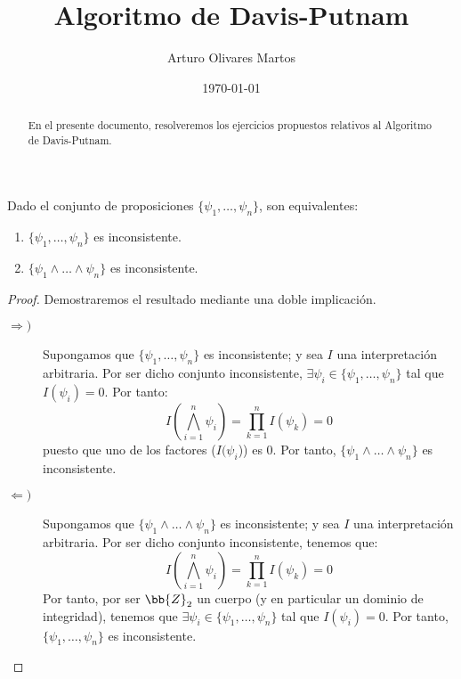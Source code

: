 \documentclass[12pt]{article}
\author{Arturo Olivares Martos}
\date{\today}
\title{Algoritmo de Davis-Putnam}
\begin{document}
    \maketitle
    \begin{abstract}
        En el presente documento, resolveremos los ejercicios propuestos relativos al Algoritmo de Davis-Putnam.
    \end{abstract}

    \begin{ejercicio}
        Dado el conjunto de proposiciones $\{\psi_1, \ldots, \psi_n\}$, son equivalentes:
        \begin{enumerate}
            \item $\{\psi_1, \ldots, \psi_n\}$ es inconsistente.
            \item $\{\psi_1 \land \ldots \land \psi_n\}$ es inconsistente.
        \end{enumerate}
        \begin{proof}
            Demostraremos el resultado mediante una doble implicación.
            \begin{description}
                \item[$\Longrightarrow)$]  Supongamos que $\{\psi_1, \ldots, \psi_n\}$ es inconsistente; y sea $I$ una interpretación arbitraria. Por ser dicho conjunto inconsistente, $\exists \psi_i \in \{\psi_1, \ldots, \psi_n\}$ tal que $I(\psi_i) = 0$. Por tanto:
                \begin{equation*}
                    I\left(\bigwedge_{i=1}^n \psi_i\right) = \prod_{k=1}^n I(\psi_k) = 0
                \end{equation*}
                puesto que uno de los factores ($I(\psi_i$)) es $0$. Por tanto, $\{\psi_1 \land \ldots \land \psi_n\}$ es inconsistente.

                \item[$\Longleftarrow)$] Supongamos que $\{\psi_1 \land \ldots \land \psi_n\}$ es inconsistente; y sea $I$ una interpretación arbitraria. Por ser dicho conjunto inconsistente, tenemos que:
                \begin{equation*}
                    I\left(\bigwedge_{i=1}^n \psi_i\right) = \prod_{k=1}^n I(\psi_k) = 0
                \end{equation*}
                Por tanto, por ser $\bb{Z}_2$ un cuerpo (y en particular un dominio de integridad), tenemos que $\exists \psi_i \in \{\psi_1, \ldots, \psi_n\}$ tal que $I(\psi_i) = 0$. Por tanto, $\{\psi_1, \ldots, \psi_n\}$ es inconsistente.
            \end{description}
        \end{proof}
    \end{ejercicio}
\end{document}
